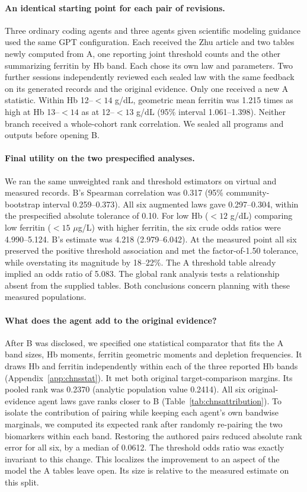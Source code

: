 \documentclass[sigconf,anonymous,review]{acmart}
\begin{document}
\paragraph{An identical starting point for each pair of revisions.}
Three ordinary coding agents and three agents given scientific modeling guidance used the same GPT configuration. Each received the Zhu article and two tables newly computed from A, one reporting joint threshold counts and the other summarizing ferritin by Hb band. Each chose its own law and parameters. Two further sessions independently reviewed each sealed law with the same feedback on its generated records and the original evidence. Only one received a new A statistic. Within Hb 12--$<14$ g/dL, geometric mean ferritin was 1.215 times as high at Hb 13--$<14$ as at 12--$<13$ g/dL (95\% interval 1.061--1.398). Neither branch received a whole-cohort rank correlation. We sealed all programs and outputs before opening B.

\paragraph{Final utility on the two prespecified analyses.}
We ran the same unweighted rank and threshold estimators on virtual and measured records. B's Spearman correlation was 0.317 (95\% community-bootstrap interval 0.259--0.373). All six augmented laws gave 0.297--0.304, within the prespecified absolute tolerance of 0.10. For low Hb ($<12$ g/dL) comparing low ferritin ($<15$ $\mu$g/L) with higher ferritin, the six crude odds ratios were 4.990--5.124. B's estimate was 4.218 (2.979--6.042). At the measured point all six preserved the positive threshold association and met the factor-of-1.50 tolerance, while overstating its magnitude by 18--22\%. The A threshold table already implied an odds ratio of 5.083. The global rank analysis tests a relationship absent from the supplied tables. Both conclusions concern planning with these measured populations.

\paragraph{What does the agent add to the original evidence?}
After B was disclosed, we specified one statistical comparator that fits the A band sizes, Hb moments, ferritin geometric moments and depletion frequencies. It draws Hb and ferritin independently within each of the three reported Hb bands (Appendix~\ref{app:chnsstat}). It met both original target-comparison margins. Its pooled rank was 0.2370 (analytic population value 0.2414). All six original-evidence agent laws gave ranks closer to B (Table~\ref{tab:chnsattribution}). To isolate the contribution of pairing while keeping each agent's own bandwise marginals, we computed its expected rank after randomly re-pairing the two biomarkers within each band. Restoring the authored pairs reduced absolute rank error for all six, by a median of 0.0612. The threshold odds ratio was exactly invariant to this change. This localizes the improvement to an aspect of the model the A tables leave open. Its size is relative to the measured estimate on this split.
\end{document}
